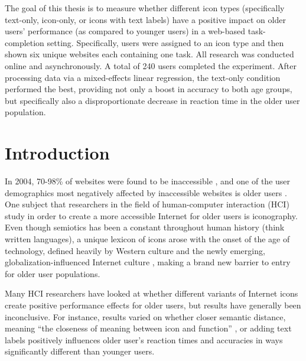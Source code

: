 \documentclass[12pt,twoside]{reedthesis}
\begin{document}
    The goal of this thesis is to measure whether different icon types (specifically text-only, icon-only, or icons with text labels) have a positive impact on older users' performance (as compared to younger users) in a web-based task-completion setting. Specifically, users were assigned to an icon type and then shown six unique websites each containing one task. All research was conducted online and asynchronously. A total of 240 users completed the experiment. After processing data via a mixed-effects linear regression, the text-only condition performed the best, providing not only a boost in accuracy to both age groups, but specifically also a disproportionate decrease in reaction time in the older user population. 



    \pagestyle{fancyplain} %
  \mainmatter %

\chapter{Introduction} \label{intro}
    In 2004, 70-98\% of websites were found to be inaccessible \cite{lazar_improving_2004}, and one of the user demographics most negatively affected by inaccessible websites is older users \cite{stephanidis_seven_2019}. One subject that researchers in the field of human-computer interaction (HCI) study in order to create a more accessible Internet for older users is iconography. Even though semiotics has been a constant throughout human history (think written languages), a unique lexicon of icons arose with the onset of the age of technology, defined heavily by Western culture and the newly emerging, globalization-influenced Internet culture \cite{ma_semiotics_1995}, making a brand new barrier to entry for older user populations.

    Many HCI researchers have looked at whether different variants of Internet icons create positive performance effects for older users, but results have generally been inconclusive. For instance, results varied on whether closer semantic distance, meaning “the closeness of meaning between icon and function” \cite{ganor_designing_nodate,liu_study_2023,dosso_how_2021,schroder_effects_2008}, or adding text labels \cite{wu_how_2022,dosso_how_2021,song_developing_2024} positively influences older user’s reaction times and accuracies in ways significantly different than younger users. 
\end{document}
